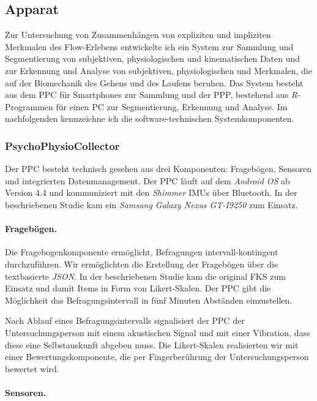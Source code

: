 \subsection{Apparat}
\label{sub:apparat}
Zur Untersuchung von Zusammenhängen von expliziten und impliziten Merkmalen des Flow-Erlebens entwickelte ich ein System zur Sammlung und Segmentierung von subjektiven, physiologischen und kinematischen Daten und zur Erkennung und Analyse von subjektiven, physiologischen und Merkmalen, die auf der Biomechanik des Gehens und des Laufens beruhen. Das System besteht aus dem \ac{PPC} für Smartphones zur Sammlung und der \ac{PPP}, bestehend aus \emph{R}-Programmen für einen PC zur Segmentierung, Erkennung und Analyse. Im nachfolgenden kennzeichne ich die software-technischen Systemkomponenten.

\subsubsection{PsychoPhysioCollector}
Der \ac{PPC} besteht technisch gesehen aus drei Komponenten: Fragebögen, Sensoren und integrierten Datenmanagement. Der \ac{PPC} läuft auf dem \emph{Android OS} ab Version 4.4 und kommuniziert mit den \emph{Shimmer} \acp{IMU} über Bluetooth. In der beschriebenen Studie kam ein \emph{Samsung Galaxy Nexus GT-I9250} zum Einsatz.

\paragraph{Fragebögen.}
Die Fragebogenkomponente ermöglicht, Befragungen intervall-kontingent durchzuführen. Wir ermöglichten die Erstellung der Fragebögen über die textbasierte \emph{JSON}. In der beschriebenen Studie kam die original \ac{FKS} zum Einsatz und damit Items in Form von Likert-Skalen. Der \ac{PPC} gibt die Möglichkeit das Befragungsintervall in fünf Minuten Abständen einzustellen.

Nach Ablauf eines Befragungsintervalls signalisiert der \ac{PPC} der Untersuchungsperson mit einem akustischen Signal und mit einer Vibration, dass diese eine Selbstauskunft abgeben muss. Die Likert-Skalen realisierten wir mit einer Bewertungskomponente, die per Fingerberührung der Untersuchungsperson bewertet wird.

\paragraph{Sensoren.}

